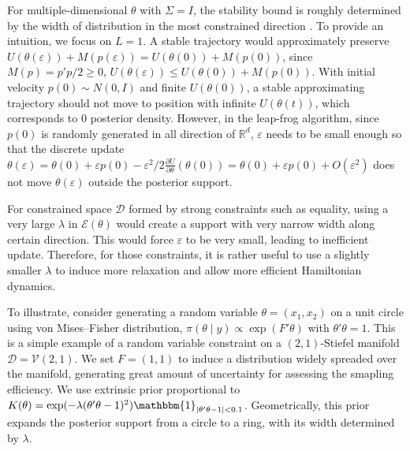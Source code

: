 \documentclass[10pt]{article}
\newcommand{\mc}[1]{\mathcal{#1}}
\begin{document}
For multiple-dimensional $\theta$ with $\Sigma=I$, the stability bound is roughly determined by the width of distribution in the most constrained direction  \citep{neal2011mcmc}. To provide an intuition, we focus on $L=1$. A stable trajectory would approximately preserve $U(\theta(\varepsilon))+M(p(\varepsilon)) = U(\theta(0))+M(p(0))$, since $M(p)= p'p/2 \ge 0$, $U(\theta(\varepsilon))\le  U(\theta(0))+M(p(0))$. With initial velocity $p(0)\sim N(0, I)$ and finite $U(\theta(0))$, a stable approximating trajectory should not move to position with infinite $U(\theta(t))$, which corresponds to $0$ posterior density. However, in the leap-frog algorithm, since  $p(0)$ is randomly generated in all direction of $\mathbb R^d$, $\varepsilon$ needs to be small enough so that the discrete update $\theta(\varepsilon)=\theta(0) + \varepsilon  p(0) - \varepsilon^2/2  \frac{\partial U}{\partial  \theta } ( \theta (0)) = \theta(0) + \varepsilon  p(0) + O(\varepsilon^2)$ does not move $\theta(\varepsilon)$ outside the posterior support.

For constrained space $\mc D$ formed by strong constraints such as equality, using a very large $\lambda$ in $\mc E(\theta)$ would create a support with very narrow width along certain direction. This would force $\varepsilon$ to be very small, leading to inefficient update. Therefore, for those constraints, it is rather useful to use a slightly smaller $\lambda$ to induce more relaxation and allow more efficient Hamiltonian dynamics.

To illustrate, consider generating a random variable $\theta=(x_1,x_2)$ on a unit circle using von Mises--Fisher distribution, $\pi(\theta \mid y) \propto \exp(F'\theta)$ with $\theta'\theta =1$. This is a simple example of a random variable constraint on a $(2,1)$-Stiefel manifold $\mc D =\mc V(2,1)$. We set $F=(1,1)$ to induce a distribution widely spreaded over the manifold, generating great amount of uncertainty for assessing the smapling efficiency. We use extrinsic prior proportional to $K(\theta)= \exp(-\lambda (\theta'\theta -1)^2) \mathbbm{1}_{|\theta'\theta -1|<0.1}$. Geometrically, this prior expands the posterior support from a circle to a ring, with its width determined by $\lambda$.
\end{document}
